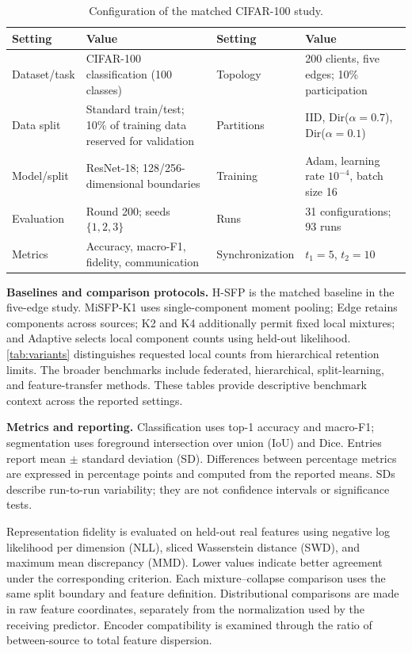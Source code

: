 \begin{table}[t]
\caption{Configuration of the matched CIFAR-100 study.}
\label{tab:setup}
\centering
\footnotesize
\begin{tabularx}{\textwidth}{@{}lXlX@{}}
\toprule
Setting & Value & Setting & Value\\
\midrule
Dataset/task & CIFAR-100 classification (100 classes) & Topology & 200 clients, five edges; 10\% participation\\
Data split & Standard train/test; 10\% of training data reserved for validation & Partitions & IID, Dir($\alpha=0.7$), Dir($\alpha=0.1$)\\
Model/split & ResNet-18; 128/256-dimensional boundaries & Training & Adam, learning rate $10^{-4}$, batch size 16\\
Evaluation & Round 200; seeds $\{1,2,3\}$ & Runs & 31 configurations; 93 runs\\
Metrics & Accuracy, macro-F1, fidelity, communication & Synchronization & $t_1=5$, $t_2=10$\\
\bottomrule
\end{tabularx}
\end{table}

\noindent\textbf{Baselines and comparison protocols.} H-SFP is the matched baseline in the five-edge study. MiSFP-K1 uses single-component moment pooling; Edge retains components across sources; K2 and K4 additionally permit fixed local mixtures; and Adaptive selects local component counts using held-out likelihood. \cref{tab:variants} distinguishes requested local counts from hierarchical retention limits.
The broader benchmarks include federated, hierarchical, split-learning, and feature-transfer methods. These tables provide descriptive benchmark context across the reported settings.

\noindent\textbf{Metrics and reporting.} Classification uses top-1 accuracy and macro-F1; segmentation uses foreground intersection over union (IoU) and Dice. Entries report mean $\pm$ standard deviation (SD). Differences between percentage metrics are expressed in percentage points and computed from the reported means. SDs describe run-to-run variability; they are not confidence intervals or significance tests.

Representation fidelity is evaluated on held-out real features using negative log likelihood per dimension (NLL), sliced Wasserstein distance (SWD), and maximum mean discrepancy (MMD). Lower values indicate better agreement under the corresponding criterion. Each mixture--collapse comparison uses the same split boundary and feature definition. Distributional comparisons are made in raw feature coordinates, separately from the normalization used by the receiving predictor. Encoder compatibility is examined through the ratio of between-source to total feature dispersion.

